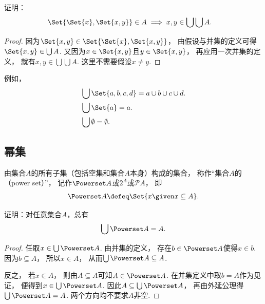 \begin{example}\label{example:集合论.有序对各坐标的取值范围}
    证明：
    \begin{align*}
        \Set{\Set{x},\Set{x,y}}\in A
        &\implies x,y\in\bigcup\bigcup A.
    \end{align*}
    \begin{proof}
        因为\(\Set{x,y}\in\Set{\Set{x},\Set{x,y}}\)，
        由假设与并集的定义可得\(\Set{x,y}\in\bigcup A\).
        又因为\(x\in\Set{x,y}\)且\(y\in\Set{x,y}\)，
        再应用一次并集的定义，
        就有\(x,y\in\bigcup\bigcup A\).
        这里不需要假设\(x\neq y\).
    \end{proof}
\end{example}

例如，
\begin{align*}
	&\bigcup\Set{a,b,c,d} = a \cup b \cup c \cup d. \\
	&\bigcup\Set{a} = a. \\
	&\bigcup\emptyset = \emptyset.
\end{align*}


\subsection{幂集}
\begin{definition}
由集合\(A\)的所有子集（包括空集和集合\(A\)本身）构成的集合，
称作“集合\(A\)的（power set）”，
记作\(\Powerset A\)或\(2^A\)或\(\mathcal{P}A\)，
即\begin{equation*}
	\Powerset A
	\defeq
	\Set{ x \given x \subseteq A }.
\end{equation*}
\end{definition}

\begin{example}
证明：对任意集合\(A\)，总有
\begin{equation}\label{equation:集合论.集的幂集的并等于集}
	\bigcup \Powerset A = A.
\end{equation}
    \begin{proof}
        任取\(x\in\bigcup\Powerset A\).
        由并集的定义，
        存在\(b\in\Powerset A\)使得\(x\in b\).
        因为\(b\subseteq A\)，
        所以\(x\in A\)，
        从而\(\bigcup\Powerset A\subseteq A\).

        反之，
        若\(x\in A\)，
        则由\(A\subseteq A\)可知\(A\in\Powerset A\).
        在并集定义中取\(b=A\)作为见证，
        便得到\(x\in\bigcup\Powerset A\).
        因此\(A\subseteq\bigcup\Powerset A\)，
        再由外延公理得\(\bigcup\Powerset A=A\).
        两个方向均不要求\(A\)非空.
    \end{proof}
\end{example}

